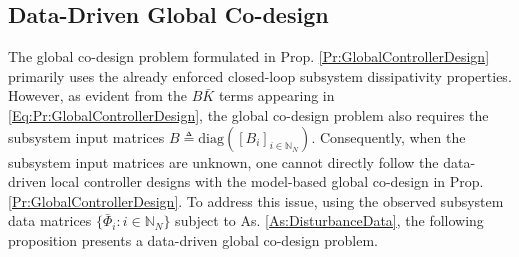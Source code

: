 \documentclass[letterpaper, 10 pt, conference]{ieeeconf}%
\newcommand{\N}{\mathbb{N}}
\newcommand{\0}{\mathbf{0}}
\newcommand{\diag}{\text{diag}}
\begin{document}
 
\subsection{Data-Driven Global Co-design}

The global co-design problem formulated in Prop. \ref{Pr:GlobalControllerDesign} primarily uses the already enforced closed-loop subsystem dissipativity properties. However, as evident from the $B\bar{K}$ terms appearing in \eqref{Eq:Pr:GlobalControllerDesign}, the global co-design problem also requires the subsystem input matrices $B \triangleq \diag([B_i]_{i\in\N_N})$. 
Consequently, when the subsystem input matrices are unknown, one cannot directly follow the data-driven local controller designs with the model-based global co-design in Prop. \ref{Pr:GlobalControllerDesign}.
To address this issue, using the observed subsystem data matrices $\{\bar{\Phi}_i: i\in\N_N\}$ subject to As. \ref{As:DisturbanceData}, the following proposition presents a data-driven global co-design problem. 

 
\end{document}
